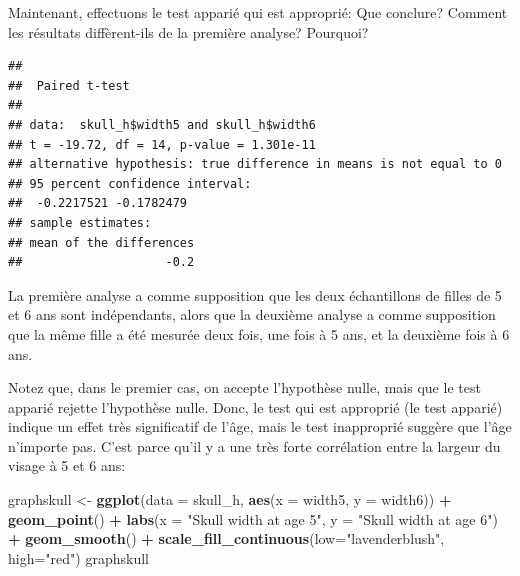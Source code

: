 \documentclass[12pt,]{book}
\newenvironment{Shaded}{\begin{snugshade}}{\end{snugshade}}
\newcommand{\DataTypeTok}[1]{\textcolor[rgb]{0.27,0.27,0.27}{#1}}
\newcommand{\KeywordTok}[1]{\textcolor[rgb]{0.27,0.27,0.27}{\textbf{#1}}}
\newcommand{\NormalTok}[1]{#1}
\newcommand{\OperatorTok}[1]{\textcolor[rgb]{0.43,0.43,0.43}{\textbf{#1}}}
\newcommand{\OtherTok}[1]{\textcolor[rgb]{0.37,0.37,0.37}{#1}}
\newcommand{\StringTok}[1]{\textcolor[rgb]{0.5,0.5,0.5}{#1}}
\begin{document}
Maintenant, effectuons le test apparié qui est approprié: Que conclure? Comment les résultats diffèrent-ils de la première analyse? Pourquoi?

\begin{Shaded}
\end{Shaded}

\begin{verbatim}
## 
## 	Paired t-test
## 
## data:  skull_h$width5 and skull_h$width6
## t = -19.72, df = 14, p-value = 1.301e-11
## alternative hypothesis: true difference in means is not equal to 0
## 95 percent confidence interval:
##  -0.2217521 -0.1782479
## sample estimates:
## mean of the differences 
##                    -0.2
\end{verbatim}

La première analyse a comme supposition que les deux échantillons de filles de 5 et 6 ans sont indépendants, alors que la deuxième analyse a comme supposition que la même fille a été mesurée deux fois, une fois à 5 ans, et la deuxième fois à 6 ans.

Notez que, dans le premier cas, on accepte l'hypothèse nulle, mais que le test apparié rejette l'hypothèse nulle. Donc, le test qui est approprié (le test apparié) indique un effet très significatif de l'âge, mais le test inapproprié suggère que l'âge n'importe pas. C'est parce qu'il y a une très forte corrélation entre la largeur du visage à 5 et 6 ans:

\begin{Shaded}
\begin{Highlighting}[]
\NormalTok{graphskull <-}\StringTok{ }\KeywordTok{ggplot}\NormalTok{(}\DataTypeTok{data =}\NormalTok{ skull_h, }\KeywordTok{aes}\NormalTok{(}\DataTypeTok{x =}\NormalTok{ width5, }\DataTypeTok{y =}\NormalTok{ width6)) }\OperatorTok{+}
\StringTok{  }\KeywordTok{geom_point}\NormalTok{() }\OperatorTok{+}
\StringTok{  }\KeywordTok{labs}\NormalTok{(}\DataTypeTok{x =} \StringTok{"Skull width at age 5"}\NormalTok{, }\DataTypeTok{y =} \StringTok{"Skull width at age 6"}\NormalTok{) }\OperatorTok{+}
\StringTok{  }\KeywordTok{geom_smooth}\NormalTok{() }\OperatorTok{+}
\StringTok{  }\KeywordTok{scale_fill_continuous}\NormalTok{(}\DataTypeTok{low=}\StringTok{"lavenderblush"}\NormalTok{, }\DataTypeTok{high=}\StringTok{"red"}\NormalTok{)}
\NormalTok{graphskull}
\end{Highlighting}
\end{Shaded}
\end{document}
